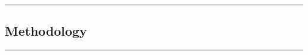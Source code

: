 {\color{gray}\hrule}
\begin{center}
\section{Methodology}
\bigskip
\end{center}
{\color{gray}\hrule}
\begin{multicols}{2}
\lipsum
\end{multicols}

